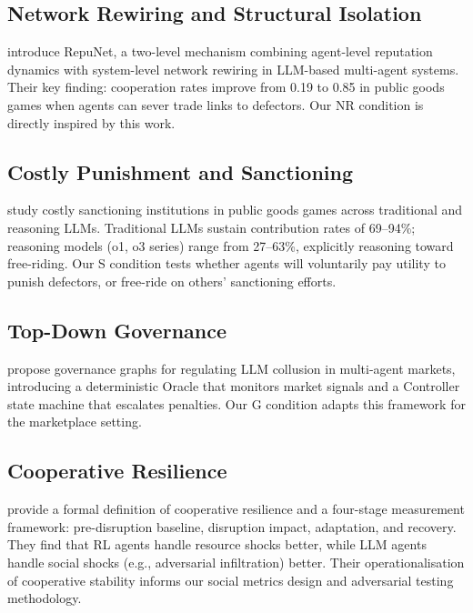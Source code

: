 \documentclass{article}
\begin{document}
\subsection{Network Rewiring and Structural Isolation}

\citet{repunet} introduce RepuNet, a two-level mechanism combining agent-level reputation dynamics with system-level network rewiring in LLM-based multi-agent systems. Their key finding: cooperation rates improve from 0.19 to 0.85 in public goods games when agents can sever trade links to defectors. Our NR condition is directly inspired by this work.

\subsection{Costly Punishment and Sanctioning}

\citet{piedrahita2025} study costly sanctioning institutions in public goods games across traditional and reasoning LLMs. Traditional LLMs sustain contribution rates of 69--94\%; reasoning models (o1, o3 series) range from 27--63\%, explicitly reasoning toward free-riding. Our S condition tests whether agents will voluntarily pay utility to punish defectors, or free-ride on others' sanctioning efforts.

\subsection{Top-Down Governance}

\citet{institutional2025} propose governance graphs for regulating LLM collusion in multi-agent markets, introducing a deterministic Oracle that monitors market signals and a Controller state machine that escalates penalties. Our G condition adapts this framework for the marketplace setting.

\subsection{Cooperative Resilience}

\citet{chaconresilience} provide a formal definition of cooperative resilience and a four-stage measurement framework: pre-disruption baseline, disruption impact, adaptation, and recovery. They find that RL agents handle resource shocks better, while LLM agents handle social shocks (e.g., adversarial infiltration) better. Their operationalisation of cooperative stability informs our social metrics design and adversarial testing methodology.
\end{document}
